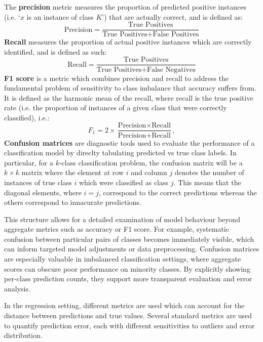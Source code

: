 \documentclass{report}
\begin{document}
The \textbf{precision} metric measures the proportion of predicted positive instances (i.e. `$x$ is an instance of class $K$') that are actually correct\cite{shaun2025principles}, and is defined as:
\begin{equation}
\text{Precision} = \frac{\text{True Positives}}{\text{True Positives} + \text{False Positives}}
\end{equation}
\textbf{Recall} measures the proportion of actual positive instances which are correctly identified\cite{shaun2025principles}, and is defined as such:
\begin{equation}
\text{Recall} = \frac{\text{True Positives}}{\text{True Positives} + \text{False Negatives}}
\end{equation}
\textbf{F1 score} is a metric which combines precision and recall to address the fundamental problem of sensitivity to class imbalance that accuracy suffers from\cite{shaun2025principles}. It is defined as the harmonic mean of the recall, where recall is the true positive rate (i.e. the proportion of instances of a given class that were correctly classified), i.e.:
\begin{equation}
F_1 = 2 \times \frac{\text{Precision} \times \text{Recall}}{\text{Precision} + \text{Recall}}
\label{eq:f1-score},
\end{equation}
\textbf{Confusion matrices} are diagnostic tools used to evaluate the performance of a classification model by direclty tabulating predicted vs true class labels\cite{aggarwal2015data}. In particular, for a $k$-class classification problem, the confusion matrix will be a $k \times k$ matrix where the element at row $i$ and column $j$ denotes the number of instances of true class $i$ which were classified as class $j$. This means that the diagonal elements, where $i=j$, correspond to the correct predictions whereas the others correspond to innacurate predictions.

This structure allows for a detailed examination of model behaviour beyond aggregate metrics such as accuracy or F1 score\cite{aggarwal2015data}. For example, systematic confusion between particular pairs of classes becomes immediately visible, which can inform targeted model adjustments or data preprocessing. Confusion matrices are especially valuable in imbalanced classification settings, where aggregate scores can obscure poor performance on minority classes. By explicitly showing per-class prediction counts, they support more transparent evaluation and error analysis.

In the regression setting, different metrics are used which can account for the distance between predictions and true values. Several standard metrics are used to quantify prediction error, each with different sensitivities to outliers and error distribution.
\end{document}
